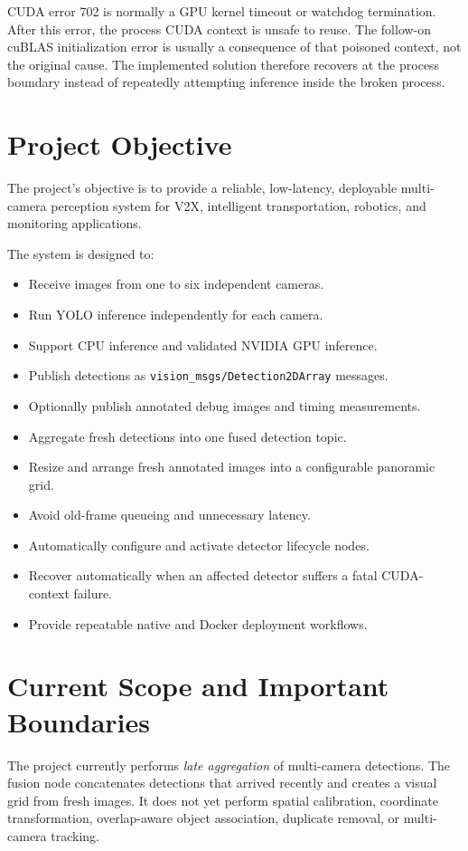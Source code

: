\documentclass[11pt,a4paper]{article}
\begin{document}
CUDA error 702 is normally a GPU kernel timeout or watchdog termination. After this error, the process CUDA context is unsafe to reuse. The follow-on cuBLAS initialization error is usually a consequence of that poisoned context, not the original cause. The implemented solution therefore recovers at the process boundary instead of repeatedly attempting inference inside the broken process.

\section{Project Objective}

The project's objective is to provide a reliable, low-latency, deployable multi-camera perception system for V2X, intelligent transportation, robotics, and monitoring applications.

The system is designed to:

\begin{itemize}
  \item Receive images from one to six independent cameras.
  \item Run YOLO inference independently for each camera.
  \item Support CPU inference and validated NVIDIA GPU inference.
  \item Publish detections as \texttt{vision\_msgs/Detection2DArray} messages.
  \item Optionally publish annotated debug images and timing measurements.
  \item Aggregate fresh detections into one fused detection topic.
  \item Resize and arrange fresh annotated images into a configurable panoramic grid.
  \item Avoid old-frame queueing and unnecessary latency.
  \item Automatically configure and activate detector lifecycle nodes.
  \item Recover automatically when an affected detector suffers a fatal CUDA-context failure.
  \item Provide repeatable native and Docker deployment workflows.
\end{itemize}

\section{Current Scope and Important Boundaries}

The project currently performs \emph{late aggregation} of multi-camera detections. The fusion node concatenates detections that arrived recently and creates a visual grid from fresh images. It does not yet perform spatial calibration, coordinate transformation, overlap-aware object association, duplicate removal, or multi-camera tracking.
\end{document}
